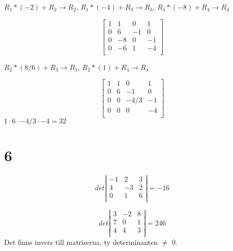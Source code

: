 \documentclass{article}
\begin{document}
$R_1 * (-2) + R_2 \rightarrow R_2$, \quad
$R_1 * (-4) + R_3 \rightarrow R_3$, \quad
$R_4 * (-8) + R_4 \rightarrow R_4$   


$$
\begin{bmatrix}
    1  & 1   &  0   &  1 \\
    0  & 6   &  -1  &  0  \\
    0  & -8  &  0   &  -1   \\
    0  &  -6  &  1   &  -4   \\
\end{bmatrix}
$$

$R_2 * (8/6) + R_3 \rightarrow R_3$, \quad
$R_2 * (1) + R_4 \rightarrow R_4$   

$$
\begin{bmatrix}
    1  & 1   &  0   &  1 \\
    0  & 6   &  -1  &  0  \\
    0  & 0   &  -4/3   &  -1   \\
    0  & 0   &  0   &  -4   \\
\end{bmatrix}
$$
$1 \cdot 6 \cdot -4/3 \cdot -4 = 32$

\section*{6}
\[ det \left| \begin{array}{ccc}
    -1 & 2 & 3 \\
     4 &-3 & 2 \\
     0 & 1 & 6 \\
\end{array} \right| = -16 \]

\[ det \left| \begin{array}{ccc}
     3 & -2  & 8 \\
     7 &  0  & 1 \\
     4 &  4  & 3 \\
\end{array} \right| = 246 \]
Det finns invers till matriserna, ty determinanten $\neq$ 0.
\end{document}
